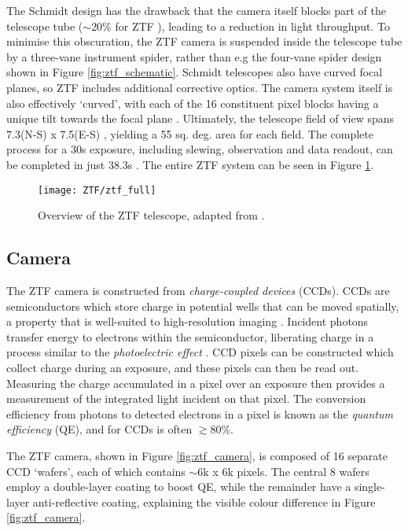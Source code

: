 The Schmidt design has the drawback that the camera itself blocks part of the telescope tube ($\sim$20\% for ZTF \cite{ztf_obs_system}), leading to a reduction in light throughput. To minimise this obscuration, the ZTF camera is suspended inside the telescope tube by a three-vane instrument spider, rather than e.g the four-vane spider design shown in Figure \ref{fig:ztf_schematic}.  Schmidt telescopes also have curved focal planes, so ZTF includes additional corrective optics. The camera system itself is also effectively `curved', with each of the 16 constituent pixel blocks having a unique tilt towards the focal plane \cite{ztf_system}. Ultimately, the telescope field of view spans 7.3\arcdeg (N-S) x 7.5\arcdeg (E-S) \cite{ztf_obs_system}, yielding a 55 sq. deg. area for each field. The complete process for a 30s exposure, including slewing, observation and data readout, can be completed in just 38.3s  \cite{ztf_system}. The entire ZTF system can be seen in Figure \ref{fig:ztf_diagram}.

\begin{figure}[!ht]
	\centering \texttt{[image: ZTF/ztf\_full]}
	\caption{Overview of the ZTF telescope, adapted from \cite{ztf_obs_system}.}
	\label{fig:ztf_diagram}
\end{figure}

\subsection*{Camera}

The ZTF camera is constructed from \emph{charge-coupled devices} (CCDs). CCDs are semiconductors which store charge in potential wells that can be moved spatially, a property that is well-suited to high-resolution imaging . Incident photons transfer energy to electrons within the semiconductor, liberating charge in a process similar to the \emph{photoelectric effect} . CCD pixels can be constructed which collect charge during an exposure, and these pixels can then be read out. Measuring the charge accumulated in a pixel over an exposure then provides a measurement of the integrated light incident on that pixel. The conversion efficiency from photons to detected electrons in a pixel is known as the \emph{quantum efficiency} (QE), and for CCDs is often $\gtrsim$80\%. 

The ZTF camera, shown in Figure \ref{fig:ztf_camera}, is composed of 16 separate CCD `wafers', each of which contains $\sim$6k x 6k pixels. The central 8 wafers employ a double-layer coating to boost QE, while the remainder have a single-layer anti-reflective coating, explaining the visible colour difference in Figure \ref{fig:ztf_camera}.

